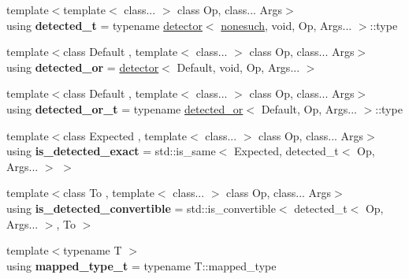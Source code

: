 \begin{DoxyCompactItemize}
{\footnotesize template$<$template$<$ class... $>$ class Op, class... Args$>$ }\\using {\bfseries detected\+\_\+t} = typename \hyperlink{structnlohmann_1_1detail_1_1detector}{detector}$<$ \hyperlink{structnlohmann_1_1detail_1_1nonesuch}{nonesuch}, void, Op, Args... $>$\+::type
\item 
\mbox{\label{namespacenlohmann_1_1detail_a240ce21919ab08e8a6cb3a5cfa412bce}} 
{\footnotesize template$<$class Default , template$<$ class... $>$ class Op, class... Args$>$ }\\using {\bfseries detected\+\_\+or} = \hyperlink{structnlohmann_1_1detail_1_1detector}{detector}$<$ Default, void, Op, Args... $>$
\item 
\mbox{\label{namespacenlohmann_1_1detail_a7ac5b8ef0363101275a2827b3b117dcf}} 
{\footnotesize template$<$class Default , template$<$ class... $>$ class Op, class... Args$>$ }\\using {\bfseries detected\+\_\+or\+\_\+t} = typename \hyperlink{structnlohmann_1_1detail_1_1detector}{detected\+\_\+or}$<$ Default, Op, Args... $>$\+::type
\item 
\mbox{\label{namespacenlohmann_1_1detail_a7542b4dbac07817fd4849ecfa4619def}} 
{\footnotesize template$<$class Expected , template$<$ class... $>$ class Op, class... Args$>$ }\\using {\bfseries is\+\_\+detected\+\_\+exact} = std\+::is\+\_\+same$<$ Expected, detected\+\_\+t$<$ Op, Args... $>$ $>$
\item 
\mbox{\label{namespacenlohmann_1_1detail_a5262e531c46e357b33007060f294673b}} 
{\footnotesize template$<$class To , template$<$ class... $>$ class Op, class... Args$>$ }\\using {\bfseries is\+\_\+detected\+\_\+convertible} = std\+::is\+\_\+convertible$<$ detected\+\_\+t$<$ Op, Args... $>$, To $>$
\item 
\mbox{\label{namespacenlohmann_1_1detail_a9c1795c148875722f8482d39e0eb9364}} 
{\footnotesize template$<$typename T $>$ }\\using {\bfseries mapped\+\_\+type\+\_\+t} = typename T\+::mapped\+\_\+type
\item 

\end{DoxyCompactItemize}
